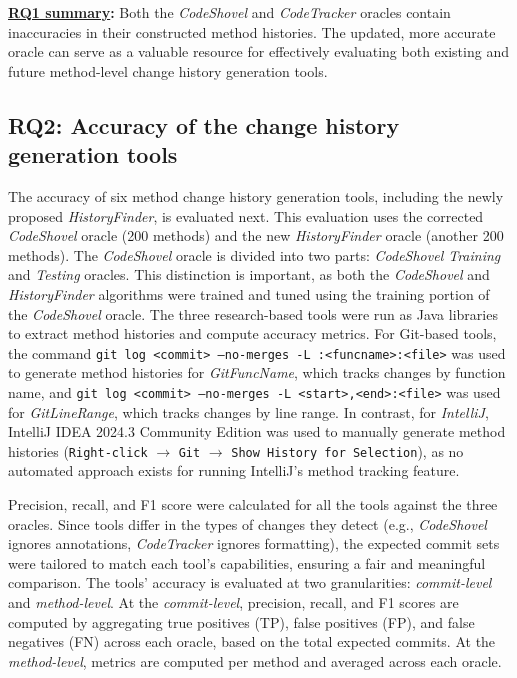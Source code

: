 \begin{tcolorbox}
\noindent\textbf{\underline{RQ1 summary}:}
Both the \textit{CodeShovel} and \textit{CodeTracker} oracles contain inaccuracies in their constructed method histories. The updated, more accurate oracle can serve as a valuable resource for effectively evaluating both existing and future method-level change history generation tools.
\end{tcolorbox}

\subsection{RQ2: Accuracy of the change history generation tools}
\label{sec:rq2-accuracy}
The accuracy of six method change history generation tools, including the newly proposed \textit{HistoryFinder}, is evaluated next. This evaluation uses the corrected \textit{CodeShovel} oracle (200 methods) and the new \textit{HistoryFinder} oracle (another 200 methods). The \textit{CodeShovel} oracle is divided into two parts: \textit{CodeShovel Training} and \textit{Testing} oracles. This distinction is important, as both the \textit{CodeShovel} and \textit{HistoryFinder} algorithms were trained and tuned using the training portion of the \textit{CodeShovel} oracle. The three research-based tools were run as Java libraries to extract method histories and compute accuracy metrics. For Git-based tools, the command \texttt{git log <commit> --no-merges -L :<funcname>:<file>} was used to generate method histories for \textit{GitFuncName}, which tracks changes by function name, and \texttt{git log <commit> --no-merges\allowbreak{} -L <start>,\allowbreak{}<end>:<file>} was used for \textit{GitLineRange}, which tracks changes by line range. In contrast, for \textit{IntelliJ}, IntelliJ IDEA 2024.3 Community Edition was used to manually generate method histories (\texttt{Right-click} $\rightarrow$ \texttt{Git} $\rightarrow$ \texttt{Show History for Selection}), as no automated approach exists for running IntelliJ's method tracking feature.

Precision, recall, and F1 score were calculated for all the tools against the three oracles. Since tools differ in the types of changes they detect (e.g., \textit{CodeShovel} ignores annotations, \textit{CodeTracker} ignores formatting), the expected commit sets were tailored to match each tool’s capabilities, ensuring a fair and meaningful comparison. The tools' accuracy is evaluated at two granularities: \emph{commit-level} and \emph{method-level}. At the \emph{commit-level}, precision, recall, and F1 scores are computed by aggregating true positives (TP), false positives (FP), and false negatives (FN) across each oracle, based on the total expected commits. At the \emph{method-level}, metrics are computed per method and averaged across each oracle.

